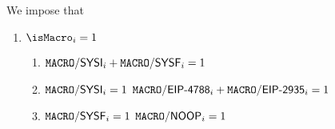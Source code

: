 We impose that
\begin{enumerate}
	\item \If $\isMacro _{i} = 1$ \Then
		\begin{enumerate}
			\item $\macroSystemSysi    _{i} + \macroSystemSysf             _{i} = 1$
			\item \If $\macroSystemSysi _{i} = 1$ \Then $\macroSystemTxnEipBeaconRoot _{i} + \macroSystemTxnEipBlockHash _{i} = 1$
			\item \If $\macroSystemSysf _{i} = 1$ \Then $\macroSystemTxnNoop _{i} = 1$
		\end{enumerate}
\end{enumerate}
